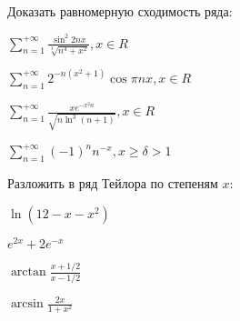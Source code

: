\documentclass[russian]{article}
\begin{document}
Доказать равномерную сходимость ряда:

$\sum_{n = 1}^{+\infty} \frac{\sin^2{2nx}}{\sqrt[3]{n^4 + x^2}}, x \in R$

$\sum_{n = 1}^{+\infty} 2^{-n(x^2 + 1)}\cos \pi nx, x \in R$

$\sum_{n = 1}^{+\infty} \frac{xe^{-x^2n}}{\sqrt{n \ln^3{(n + 1)}}}, x \in R$

$\sum_{n = 1}^{+\infty} (-1)^n n^{-x}, x \ge \delta > 1$

Разложить в ряд Тейлора по степеням $x$:

$\ln(12 - x - x^2)$

$e^{2x} + 2e^{-x}$

$\arctan\frac{x + 1/2}{x - 1/2}$

$\arcsin\frac{2x}{1 + x^2}$
\end{document}
